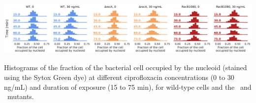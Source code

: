 \begin{suppfigure*}[htbp]
    \begin{center}
    \includegraphics[width=\textwidth]{SI_Figures/Mutants_nucleoid_compaction.pdf}
    \end{center}
    \caption{Histograms of the fraction of the bacterial cell occupied by the nucleoid (stained using the Sytox Green dye) at different ciprofloxacin concentrations (0 to 30 ng/mL) and duration of exposure (15 to 75 min), for wild-type cells and the \dreca\ and \teneighty\ mutants.}
    \label{SIFig:mutants_nucleoid_compaction}
\end{suppfigure*}
